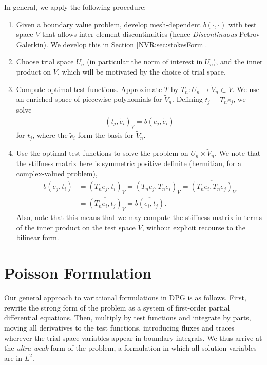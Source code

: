 In general, we apply the following procedure:
\begin{enumerate}
\sloppy
\item Given a boundary value problem, develop mesh-dependent $b(\cdot,\cdot)$ with test space $V$ that allows inter-element discontinuities (hence \emph{Discontinuous} Petrov-Galerkin).  We develop this in Section \ref{NVR:sec:stokesForm}.
\item Choose trial space $U_{n}$ (in particular the norm of interest in $U_{n}$), and the inner product on $V$, which will be motivated by the choice of trial space.
\item Compute optimal test functions.
Approximate $T$ by $T_{n}: U_{n} \rightarrow \widetilde{V}_{n} \subset V$.  We use an enriched space of piecewise polynomials for $\widetilde{V}_{n}$.  Defining $t_{j} = T_{n} e_{j}$, we solve
\begin{eqnarray*}
(t_{j},\tilde{e}_{i})_{V} = b(e_{j},\tilde{e}_{i})
\end{eqnarray*}
for $t_{j}$, where the $\tilde{e}_{i}$ form the basis for $\widetilde{V}_{n}$.
\item Use the optimal test functions to solve the problem on $U_{n} \times \widetilde{V}_{n}$.  We note that the stiffness matrix here is symmetric positive definite (hermitian, for a complex-valued problem),
\begin{align*}
b(e_{j},t_{i}) &= (T_{n}e_{j}, t_{i})_{V} = (T_{n}e_{j}, T_{n}e_{i})_{V} = \overline{(T_{n}e_{i}, T_{n}e_{j})}_{V} \\
               &= \overline{(T_{n}e_{i}, t_{j})}_{V} = \overline{b(e_{i}, t_{j})}.
\end{align*}
Also, note that this means that we may compute the stiffness matrix in terms of the inner product on the test space $V$, without explicit recourse to the bilinear form.
\end{enumerate}

\section{Poisson Formulation}\label{NVR:sec:poissonForm}
Our general approach to variational formulations in DPG is as follows.  First, rewrite the strong form of the problem as a system of first-order partial differential equations.  Then, multiply by test functions and integrate by parts, moving all derivatives to the test functions, introducing fluxes and traces wherever the trial space variables appear in boundary integrals.  We thus arrive at the \emph{ultra-weak} form of the problem, a formulation in which all solution variables are in $L^{2}$.

